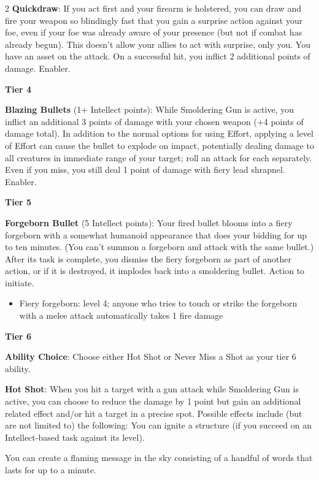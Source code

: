 \begin{multicols}{2}
\textbf{Quickdraw}: If you act first and your firearm is holstered, you can draw and fire your weapon so blindingly fast that you gain a surprise action against your foe, even if your foe was already aware of your presence (but not if combat has already begun). This doesn’t allow your allies to act with surprise, only you. You have an asset on the attack. On a successful hit, you inflict 2 additional points of damage. Enabler. 

\textbf{Tier 4} 

\textbf{Blazing Bullets} (1+ Intellect points): While Smoldering Gun is active, you inflict an additional 3 points of damage with your chosen weapon (+4 points of damage total). In addition to the normal options for using Effort, applying a level of Effort can cause the bullet to explode on impact, potentially dealing damage to all creatures in immediate range of your target; roll an attack for each separately. Even if you miss, you still deal 1 point of damage with fiery lead shrapnel. Enabler. 

\textbf{Tier 5} 

\textbf{Forgeborn Bullet} (5 Intellect points): Your fired bullet blooms into a fiery forgeborn with a somewhat humanoid appearance that does your bidding for up to ten minutes. (You can’t summon a forgeborn and attack with the same bullet.) After its task is complete, you dismiss the fiery forgeborn as part of another action, or if it is destroyed, it implodes back into a smoldering bullet. Action to initiate.

\begin{itemize}
\item Fiery forgeborn: level 4; anyone who tries to touch or strike the forgeborn with a melee attack automatically takes 1 fire damage  
\end{itemize}

\textbf{Tier 6}
 
\textbf{Ability Choice}: Choose either Hot Shot or Never Miss a Shot as your tier 6 ability. 

\textbf{Hot Shot}: When you hit a target with a gun attack while Smoldering Gun is active, you can choose to reduce the damage by 1 point but gain an additional related effect and/or hit a target in a precise spot. Possible effects include (but are not limited to) the following: You can ignite a structure (if you succeed on an Intellect-based task against its level). 

You can create a flaming message in the sky consisting of a handful of words that lasts for up to a minute. 


\end{multicols}
